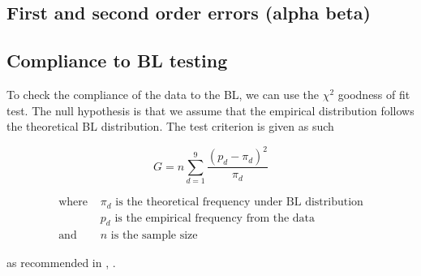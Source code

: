 \subsection{First and second order errors (alpha beta)}

\subsection{Compliance to BL testing}
To check the compliance of the data to the BL, we can use the $\chi^2$ goodness of fit test. The null hypothesis is that we assume that the empirical distribution follows the theoretical BL distribution. The test criterion is given as such 

\begin{equation}
    \label{chi-sq-test}
    G= n \sum\limits_{d=1}^{9} \frac{(p_d -\pi_d)^2}{\pi_d} 
\end{equation}

\begin{align*}
    \text{where } &\pi_d \text{ is the theoretical frequency under BL distribution} \\
    &p_d \text{ is the empirical frequency from the data} \\ 
    \text{and } &n \text{ is the sample size}
\end{align*} 

as recommended in \citeauthor{Hronova2023}, \citeyear{Hronova2023}.

